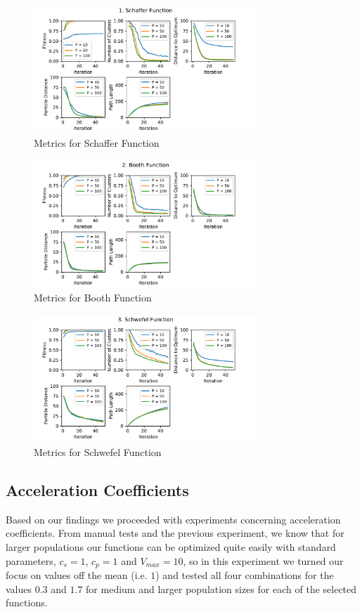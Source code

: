 \documentclass[12pt]{article}
\begin{document}
\begin{figure}[h!]
	\centering
	\includegraphics[width=0.75\textwidth]{figures/ex2/ex2-1.pdf}
	\caption{Metrics for Schaffer Function}
	\label{fig:ex2-1}
\end{figure}
\begin{figure}[h!]
	\centering
	\includegraphics[width=0.75\textwidth]{figures/ex2/ex2-2.pdf}
	\caption{Metrics for Booth Function}
	\label{fig:ex2-2}
\end{figure}
\begin{figure}[h!]
	\centering
	\includegraphics[width=0.75\textwidth]{figures/ex2/ex2-3.pdf}
	\caption{Metrics for Schwefel Function}
	\label{fig:ex2-3}
\end{figure}


\subsection{Acceleration Coefficients}
Based on our findings we proceeded with experiments concerning acceleration coefficients. 
From manual tests and the previous experiment, we know that for larger populations our functions can be optimized quite easily with standard parameters, $c_s=1$, $c_p=1$ and $V_{max}=10$, so in this experiment we turned our focus on values off the mean (i.e. $1$) and tested all four combinations for the values $0.3$ and $1.7$ for medium and larger population sizes for each of the selected functions. 
\end{document}
